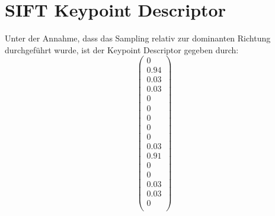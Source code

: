 \setcounter{section}{2}
\section{SIFT Keypoint Descriptor	}
Unter der Annahme, dass das Sampling relativ zur dominanten Richtung durchgeführt wurde,
ist der Keypoint Descriptor gegeben durch:
$$
	\begin{pmatrix}
		0    \\
		0.94 \\
		0.03 \\
		0.03 \\
		0    \\
		0    \\
		0    \\
		0    \\
		0    \\
		0.03 \\
		0.91 \\
		0    \\
		0    \\
		0.03 \\
		0.03 \\
		0    \\
	\end{pmatrix}
$$
